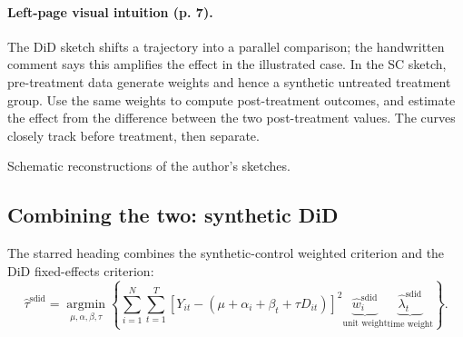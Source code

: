 \paragraph{Left-page visual intuition (p. 7).}
The DiD sketch shifts a trajectory into a parallel comparison; the handwritten comment says this amplifies the effect in the illustrated case. In the SC sketch, pre-treatment data generate weights and hence a synthetic untreated treatment group. Use the same weights to compute post-treatment outcomes, and estimate the effect from the difference between the two post-treatment values. The curves closely track before treatment, then separate.
\begin{center}

{\small Schematic reconstructions of the author's sketches.}
\end{center}


\subsection{Combining the two: synthetic DiD}
The starred heading combines the synthetic-control weighted criterion and the DiD fixed-effects criterion:
\[
\widehat\tau^{\mathrm{sdid}}
=\operatorname*{argmin}_{\mu,\alpha,\beta,\tau}
\left\{\sum_{i=1}^{N}\sum_{t=1}^{T}
[Y_{it}-(\mu+\alpha_i+\beta_t+\tau D_{it})]^2
\underbrace{\widehat w_i^{\mathrm{sdid}}}_{\text{unit weight}}
\underbrace{\widehat\lambda_t^{\mathrm{sdid}}}_{\text{time weight}}\right\}.
\]
